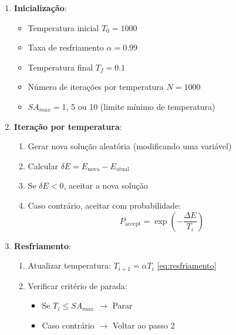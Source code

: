 \documentclass[12pt]{article}
\begin{document}
\begin{enumerate}
    \item \textbf{Inicialização}:
    \begin{itemize}
        \item Temperatura inicial $T_0 = 1000$
        \item Taxa de resfriamento $\alpha = 0.99$
        \item Temperatura final $T_f = 0.1$
        \item Número de iterações por temperatura $N = 1000$
        \item $SA_{max} = 1$, 5 ou 10 (limite mínimo de temperatura)
    \end{itemize}
    
    \item \textbf{Iteração por temperatura}:
    \begin{enumerate}
        \item Gerar nova solução aleatória (modificando uma variável)
        \item Calcular $\delta E = E_{\text{nova}} - E_{\text{atual}}$
        \item Se $\delta E < 0$, aceitar a nova solução
        \item Caso contrário, aceitar com probabilidade:
        \begin{equation}
            P_{\text{accept}} = \exp\left(-\frac{\Delta E}{T_i}\right)
            \label{eq:probabilidade}
        \end{equation}
    \end{enumerate}
    
    \item \textbf{Resfriamento}:
    \begin{enumerate}
        \item Atualizar temperatura: $T_{i+1} = \alpha T_i$ \eqref{eq:resfriamento}
        \item Verificar critério de parada:
        \begin{itemize}
            \item Se $T_i \leq SA_{max}$ $\rightarrow$ Parar
            \item Caso contrário $\rightarrow$ Voltar ao passo 2
        \end{itemize}
    \end{enumerate}
\end{enumerate}
\end{document}
